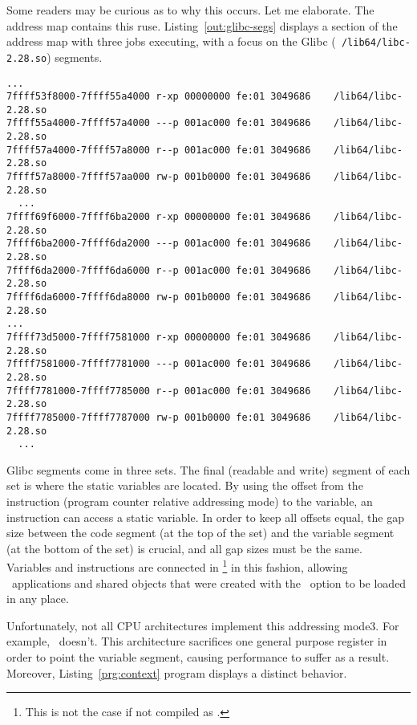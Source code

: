 Some readers may be curious as to why this occurs. Let me
elaborate. The address map contains this
ruse. Listing~\ref{out:glibc-segs} displays a section of the address
map with three jobs executing, with a focus on the Glibc  ({\tt
  /lib64/libc-2.28.so}) segments.  

\begin{lstlisting}[basicstyle=\tiny\tt, frame=tRBl, label=out:glibc-segs]
  ...
7ffff53f8000-7ffff55a4000 r-xp 00000000 fe:01 3049686    /lib64/libc-2.28.so
7ffff55a4000-7ffff57a4000 ---p 001ac000 fe:01 3049686    /lib64/libc-2.28.so
7ffff57a4000-7ffff57a8000 r--p 001ac000 fe:01 3049686    /lib64/libc-2.28.so
7ffff57a8000-7ffff57aa000 rw-p 001b0000 fe:01 3049686    /lib64/libc-2.28.so
  ...
7ffff69f6000-7ffff6ba2000 r-xp 00000000 fe:01 3049686    /lib64/libc-2.28.so
7ffff6ba2000-7ffff6da2000 ---p 001ac000 fe:01 3049686    /lib64/libc-2.28.so
7ffff6da2000-7ffff6da6000 r--p 001ac000 fe:01 3049686    /lib64/libc-2.28.so
7ffff6da6000-7ffff6da8000 rw-p 001b0000 fe:01 3049686    /lib64/libc-2.28.so
...
7ffff73d5000-7ffff7581000 r-xp 00000000 fe:01 3049686    /lib64/libc-2.28.so
7ffff7581000-7ffff7781000 ---p 001ac000 fe:01 3049686    /lib64/libc-2.28.so
7ffff7781000-7ffff7785000 r--p 001ac000 fe:01 3049686    /lib64/libc-2.28.so
7ffff7785000-7ffff7787000 rw-p 001b0000 fe:01 3049686    /lib64/libc-2.28.so
  ...
\end{lstlisting}

Glibc segments come in three sets. The final (readable and write)
segment of each set is where the static variables are located. By
using the offset from the instruction (program counter relative
addressing mode) to the variable, an instruction can access a static
variable. In order to keep all offsets equal, the gap size between the
code segment (at the top of the set) and the variable segment (at the
bottom of the set) is crucial, and all gap sizes must be the
same. Variables and instructions are connected in \PIE\footnote{This is
not the case if not compiled as \PIE.} in this 
fashion, allowing \PIE\ applications and shared objects that were
created with the \PIC\ option to be loaded in any place.

Unfortunately, not all CPU architectures implement this addressing
mode3. For example, \INTEL\ doesn't. This architecture sacrifices one
general purpose register in order to point the variable segment,
causing performance to suffer as a result. Moreover,
Listing~\ref{prg:context} program displays a distinct behavior.
